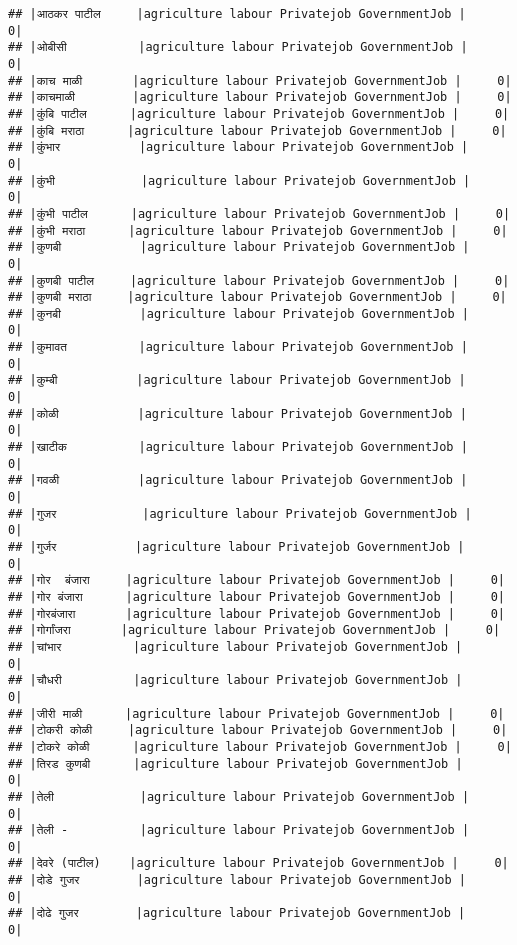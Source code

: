 \documentclass[
]{article}
\begin{document}
\begin{verbatim}
## |आठकर पाटील     |agriculture labour Privatejob GovernmentJob |     0|
## |ओबीसी          |agriculture labour Privatejob GovernmentJob |     0|
## |काच माळी       |agriculture labour Privatejob GovernmentJob |     0|
## |काचमाळी        |agriculture labour Privatejob GovernmentJob |     0|
## |कुंबि पाटील      |agriculture labour Privatejob GovernmentJob |     0|
## |कुंबि मराठा      |agriculture labour Privatejob GovernmentJob |     0|
## |कुंभार           |agriculture labour Privatejob GovernmentJob |     0|
## |कुंभी            |agriculture labour Privatejob GovernmentJob |     0|
## |कुंभी पाटील      |agriculture labour Privatejob GovernmentJob |     0|
## |कुंभी मराठा      |agriculture labour Privatejob GovernmentJob |     0|
## |कुणबी           |agriculture labour Privatejob GovernmentJob |     0|
## |कुणबी पाटील     |agriculture labour Privatejob GovernmentJob |     0|
## |कुणबी मराठा     |agriculture labour Privatejob GovernmentJob |     0|
## |कुनबी           |agriculture labour Privatejob GovernmentJob |     0|
## |कुमावत          |agriculture labour Privatejob GovernmentJob |     0|
## |कुम्बी           |agriculture labour Privatejob GovernmentJob |     0|
## |कोळी           |agriculture labour Privatejob GovernmentJob |     0|
## |खाटीक          |agriculture labour Privatejob GovernmentJob |     0|
## |गवळी           |agriculture labour Privatejob GovernmentJob |     0|
## |गुजर            |agriculture labour Privatejob GovernmentJob |     0|
## |गुर्जर           |agriculture labour Privatejob GovernmentJob |     0|
## |गोर  बंजारा     |agriculture labour Privatejob GovernmentJob |     0|
## |गोर बंजारा      |agriculture labour Privatejob GovernmentJob |     0|
## |गोरबंजारा       |agriculture labour Privatejob GovernmentJob |     0|
## |गोर्गांजरा       |agriculture labour Privatejob GovernmentJob |     0|
## |चांभार          |agriculture labour Privatejob GovernmentJob |     0|
## |चौधरी          |agriculture labour Privatejob GovernmentJob |     0|
## |जीरी माळी      |agriculture labour Privatejob GovernmentJob |     0|
## |टोकरी कोळी     |agriculture labour Privatejob GovernmentJob |     0|
## |टोकरे कोळी      |agriculture labour Privatejob GovernmentJob |     0|
## |तिरड कुणबी      |agriculture labour Privatejob GovernmentJob |     0|
## |तेली            |agriculture labour Privatejob GovernmentJob |     0|
## |तेली -          |agriculture labour Privatejob GovernmentJob |     0|
## |देवरे (पाटील)    |agriculture labour Privatejob GovernmentJob |     0|
## |दोडे गुजर        |agriculture labour Privatejob GovernmentJob |     0|
## |दोढे गुजर        |agriculture labour Privatejob GovernmentJob |     0|

\end{verbatim}
\end{document}
